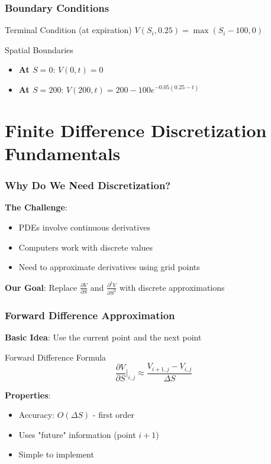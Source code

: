 \documentclass[aspectratio=169]{beamer}
\begin{document}
\begin{frame}
\frametitle{Boundary Conditions}
\begin{block}{Terminal Condition (at expiration)}
\(V(S_i, 0.25) = \max(S_i - 100, 0)\)
\end{block}

\begin{block}{Spatial Boundaries}
\begin{itemize}
\item \textbf{At \(S = 0\)}: \(V(0, t) = 0\)
\item \textbf{At \(S = 200\)}: \(V(200, t) = 200 - 100e^{-0.05(0.25-t)}\)
\end{itemize}
\end{block}
\end{frame}

\section{Finite Difference Discretization Fundamentals}

\begin{frame}
\frametitle{Why Do We Need Discretization?}
\textbf{The Challenge}:
\begin{itemize}
\item PDEs involve continuous derivatives
\item Computers work with discrete values
\item Need to approximate derivatives using grid points
\end{itemize}

\textbf{Our Goal}:
Replace \(\frac{\partial V}{\partial S}\) and \(\frac{\partial^2 V}{\partial S^2}\) with discrete approximations
\end{frame}

\begin{frame}
\frametitle{Forward Difference Approximation}
\textbf{Basic Idea}: Use the current point and the next point

\begin{block}{Forward Difference Formula}
\[\frac{\partial V}{\partial S} \bigg|_{i,j} \approx \frac{V_{i+1,j} - V_{i,j}}{\Delta S}\]
\end{block}

\textbf{Properties}:
\begin{itemize}
\item Accuracy: \(O(\Delta S)\) - first order
\item Uses "future" information (point \(i+1\))
\item Simple to implement
\end{itemize}
\end{frame}
\end{document}
